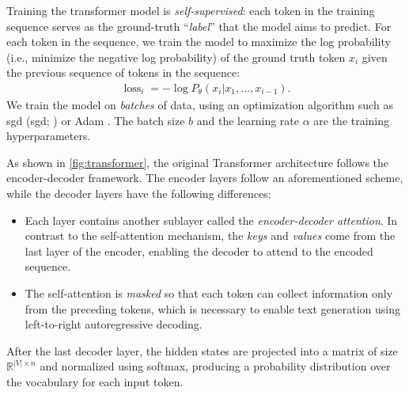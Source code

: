 Training the transformer model is \emph{self-supervised}: each token in the training sequence serves as the ground-truth ``\emph{label}'' that the model aims to predict. For each token in the sequence, we train the model to maximize the log probability (i.e., minimize the negative log probability) of the ground truth token $x_i$ given the previous sequence of tokens in the sequence:
\begin{align}
    \operatorname{loss}_i = -\log P_\theta(x_i|x_1, \hdots, x_{i-1}).
\end{align}
We train the model on \emph{batches} of data, using an optimization algorithm such as \acl{sgd} (\acs{sgd}; \citealp[p.~275]{goodfellow2016deep}) or Adam \cite{kingma2014adam}. The batch size $b$ and the learning rate $\alpha$ are the training hyperparameters.

As shown in \autoref{fig:transformer}, the original Transformer architecture follows the encoder-decoder framework. The encoder layers follow an aforementioned scheme, while the decoder layers have the following differences:
\begin{itemize}
    \item Each layer contains another sublayer called the \emph{encoder-decoder attention}. In contrast to the self-attention mechanism, the \emph{keys} and \emph{values} come from the last layer of the encoder, enabling the decoder to attend to the encoded sequence.
    \item The self-attention is \emph{masked} so that each token can collect information only from the preceding tokens, which is necessary to enable text generation using left-to-right autoregressive decoding.
\end{itemize}
After the last decoder layer, the hidden states are projected into a matrix of size $\mathbb{R}^{|V|\times n}$ and normalized using softmax, producing a probability distribution over the vocabulary for each input token.

